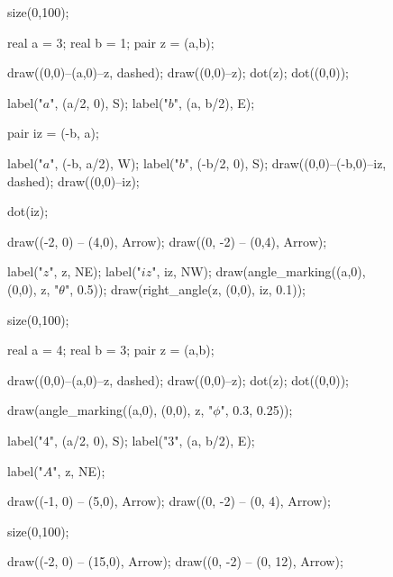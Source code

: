 \documentclass[../gatm.tex]{subfiles}
\begin{document}
\begin{figure}[h]
	\begin{center}
		\begin{minipage}[b]{0.25\textwidth}
			\centering
			\begin{asy}[width=\textwidth]
				size(0,100);
				
				real a = 3;
				real b = 1;
				pair z = (a,b);
				
				draw((0,0)--(a,0)--z, dashed);
				draw((0,0)--z);
				dot(z);
				dot((0,0));
				
				label("$a$", (a/2, 0), S);
				label("$b$", (a, b/2), E);
				
				pair iz = (-b, a);
				
				label("$a$", (-b, a/2), W);
				label("$b$", (-b/2, 0), S);
				draw((0,0)--(-b,0)--iz, dashed);
				draw((0,0)--iz);
				
				dot(iz);
				
				draw((-2, 0) -- (4,0), Arrow);
				draw((0, -2) -- (0,4), Arrow);
				
				label("$z$", z, NE);
				label("$iz$", iz, NW);
				draw(angle_marking((a,0), (0,0), z, "$\theta$", 0.5));
				draw(right_angle(z, (0,0), iz, 0.1));
			\end{asy}
		\end{minipage}
		\hfill
		\begin{minipage}[b]{0.25\textwidth}
			\centering
			\begin{asy}[width=\textwidth]
				size(0,100);
				
				real a = 4;
				real b = 3;
				pair z = (a,b);
				
				draw((0,0)--(a,0)--z, dashed);
				draw((0,0)--z);
				dot(z);
				dot((0,0));
				
				draw(angle_marking((a,0), (0,0), z, "$\phi$", 0.3, 0.25));
				
				label("$4$", (a/2, 0), S);
				label("$3$", (a, b/2), E);
				
				label("$A$", z, NE);
				
				draw((-1, 0) -- (5,0), Arrow);
				draw((0, -2) -- (0, 4), Arrow);
			\end{asy}
		\end{minipage}
		\hfill
		\begin{minipage}[b]{0.4\textwidth}
			\centering
			\begin{asy}[width=0.7\textwidth]
				size(0,100);
				
				draw((-2, 0) -- (15,0), Arrow);
				draw((0, -2) -- (0, 12), Arrow);
				

\end{asy}
\end{minipage}
\end{center}
\end{figure}
\end{document}
